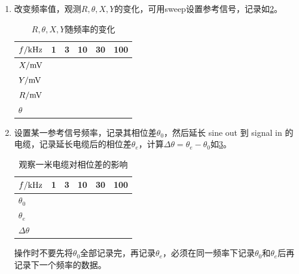 \documentclass[11pt,a4paper]{ctexart}
\newcommand{\red}{\color{red}}
\begin{document}
\begin{enumerate}
\begin{table}[H]
\centering

\begin{tabular}{|p{15mm}|p{15mm}|p{15mm}|p{15mm}|p{15mm}|p{15mm}|p{15mm}|p{15mm}|}
\hline
$\theta$ & $0^\circ$ & $15^\circ$ & $30^\circ$ & $45^\circ$ & $60^\circ$ & $75^\circ$ & $90^\circ$ \\ \hline
$X/{\rm mV}$ &  &  &  &  &  &  &  \\ \hline
$Y/{\rm mV}$ &  &  &  &  &  &  &  \\ \hline
\end{tabular}

\caption{$X,Y$随$\theta$的变化\label{tab:tb2}}
\end{table}
理论关系为$X= R\cos \theta$，$Y = R\sin \theta$。估算上面的测量结果与理论的吻合程度\uline{\hspace{4cm}}。


\item 改变频率值，观测$R,\theta ,X,Y$的变化，可用sweep设置参考信号，记录如\cref{tab:tb3}。

\begin{table}[H]
\centering

\begin{tabular}{|p{15mm}|p{15mm}|p{15mm}|p{15mm}|p{15mm}|p{15mm}|}
\hline
$f/{\rm kHz}$ & 1 & 3 & 10 & 30 & 100 \\ \hline
$X/{\rm mV}$ &  &  &  &  &  \\ \hline
$Y/{\rm mV}$ &  &  &  &  &  \\ \hline
$R/{\rm mV}$ &  &  &  &  &  \\ \hline
$\theta$ &  &  &  &  &  \\ \hline
\end{tabular}

\caption{$R,\theta ,X,Y$随频率的变化\label{tab:tb3}}
\end{table}

\item 设置某一参考信号频率，记录其相位差$\theta_0$，然后延长 sine out 到 signal in 的电缆，记录延长电缆后的相位差$\theta_e$，计算$\Delta \theta = \theta_e - \theta_0$如\cref{tab:tb4}。
\begin{table}[H]
\centering

\begin{tabular}{|p{15mm}|p{15mm}|p{15mm}|p{15mm}|p{15mm}|p{15mm}|}
\hline
$f/{\rm kHz}$ & 1 & 3 & 10 & 30 & 100 \\ \hline
$\theta_0$ &  &  &  &  &  \\ \hline
$\theta_e$ &  &  &  &  &  \\ \hline
$\Delta \theta$ &  &  &  &  &  \\ \hline
\end{tabular}

\caption{观察一米电缆对相位差的影响\label{tab:tb4}}
\end{table}
操作时{\red 不要}先将$\theta_0$全部记录完，再记录$\theta_e$，必须在同一频率下记录$\theta_0$和$\theta_e$后再记录下一个频率的数据。



\end{enumerate}
\end{document}
